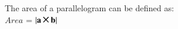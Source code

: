 %      
%      
%      
%      
%      
The area of a parallelogram can be defined as:\\
$Area$ = $\abs{\vec{a} \Cross \vec{b}} $

